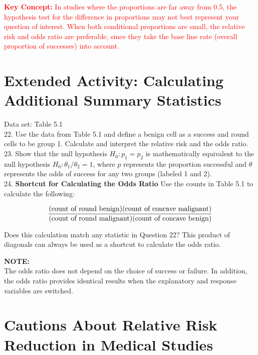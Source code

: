 \documentclass[
]{report}
\begin{document}
\Large

\textbf{\textcolor{red}{Key Concept:}}
\textcolor{red}{In studies where the proportions are far away from 0.5, the hypothesis test for the difference in proportions may not best represent your question of interest. When both conditional proportions are small, the relative risk and odds ratio are preferable, since they take the base line rate (overall proportion of successes) into account.}
\normalsize

\hypertarget{extended-activity-calculating-additional-summary-statistics}{%
\section*{Extended Activity: Calculating Additional Summary Statistics}\label{extended-activity-calculating-additional-summary-statistics}}

Data set: Table 5.1\\
22. Use the data from Table 5.1 and define a benign cell as a success and round cells to be group 1. Calculate and interpret the relative risk and the odds ratio.\\
23. Show that the null hypothesis \(H_0: p_1 = p_2\) is mathematically equivalent to the null hypothesis \(H_0: \theta_1/\theta_2 = 1\), where \(p\) represents the proportion successful and \(\theta\) represents the odds of success for any two groups (labeled 1 and 2).\\
24. \textbf{Shortcut for Calculating the Odds Ratio} Use the counts in Table 5.1 to calculate the following:

\begin{align}
\frac{\text{(count of round benign)(count of concave malignant)}}{\text{(count of round malignant)(count of concave benign)}}
\notag
\end{align}

Does this calculation match any statistic in Question 22? This product of diagonals can always be used as a shortcut to calculate the odds ratio.

\large

\textbf{NOTE:}\\
The odds ratio does not depend on the choice of success or failure. In addition, the odds ratio provides identical results when the explanatory and response variables are switched.\\
\normalsize

\hypertarget{cautions-about-relative-risk-reduction-in-medical-studies}{%
\section*{Cautions About Relative Risk Reduction in Medical Studies}\label{cautions-about-relative-risk-reduction-in-medical-studies}}
\end{document}

